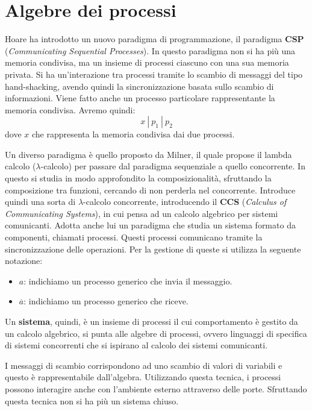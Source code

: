 \section{Algebre dei processi}
Hoare ha introdotto un nuovo paradigma di programmazione, il paradigma \textbf{CSP}
(\textit{Communicating Sequential Processes}). In questo paradigma non si ha
più una memoria condivisa, ma un insieme di processi ciascuno con una sua memoria
privata. Si ha un'interazione tra processi tramite lo scambio di messaggi del
tipo hand-shacking, avendo quindi la sincronizzazione basata sullo scambio
di informazioni. Viene fatto anche un processo particolare rappresentante la
memoria condivisa. Avremo quindi:
\begin{equation}
    x \ | \ p_1 \ | \ p_2
\end{equation}
dove $x$ che rappresenta la memoria condivisa dai due processi.

Un diverso paradigma è quello proposto da Milner, il quale propose il lambda
calcolo ($\lambda$-calcolo) per passare dal paradigma sequenziale a quello
concorrente. In questo si studia in modo approfondito la composizionalità,
sfruttando la composizione tra funzioni, cercando di non perderla nel concorrente.
Introduce quindi una sorta di $\lambda$-calcolo concorrente, introducendo il
\textbf{CCS} (\textit{Calculus of Communicating Systems}), in cui pensa ad un
calcolo algebrico per sistemi comunicanti. Adotta anche lui un paradigma che
studia un sistema formato da componenti, chiamati processi. Questi processi
comunicano tramite la sincronizzazione delle operazioni. Per la gestione di
queste si utilizza la seguente notazione:
\begin{itemize}
    \item \textbf{$a$}: indichiamo un processo generico che invia il messaggio.
    \item \textbf{$\overline{a}$}: indichiamo un processo generico che riceve.
\end{itemize}
Un \textbf{sistema}, quindi, è un insieme di processi il cui comportamento è
gestito da un calcolo algebrico, si punta alle algebre di processi, ovvero
linguaggi di specifica di sistemi concorrenti che si ispirano al calcolo dei
sistemi comunicanti.

I messaggi di scambio corrispondono ad uno scambio di valori di variabili e questo
è rappresentabile dall'algebra. Utilizzando questa tecnica, i processi possono
interagire anche con l'ambiente esterno attraverso delle porte. Sfruttando
questa tecnica non si ha più un sistema chiuso.

